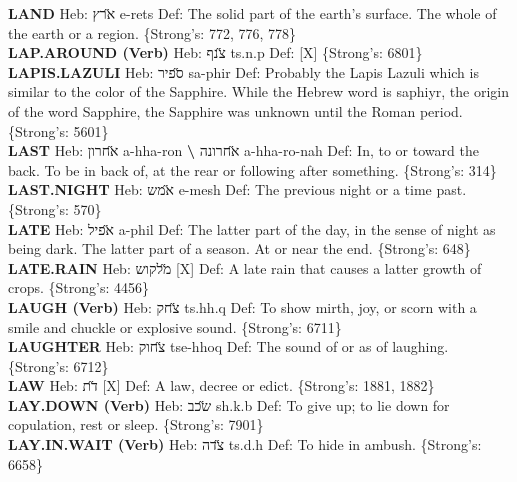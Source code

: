 {\textbf{LAND} Heb: {\large\H ארץ} e-rets Def: The solid part of the earth's surface. The whole of the earth or a region. \{Strong's: 772, 776, 778\}\hfill{}\\

\textbf{LAP.AROUND (Verb)} Heb: {\large\H צנף} ts.n.p Def: {[}X{]} \{Strong's: 6801\}\hfill{}\\

\textbf{LAPIS.LAZULI} Heb: {\large\H ספיר} sa-phir Def: Probably the Lapis Lazuli which is similar to the color of the Sapphire. While the Hebrew word is saphiyr, the origin of the word Sapphire, the Sapphire was unknown until the Roman period. \{Strong's: 5601\}\hfill{}\\

\textbf{LAST} Heb: {\large\H אחרון} a-hha-ron \textbf{\textbackslash{}} {\large\H אחרונה} a-hha-ro-nah Def: In, to or toward the back. To be in back of, at the rear or following after something. \{Strong's: 314\}\hfill{}\\

\textbf{LAST.NIGHT} Heb: {\large\H אמש} e-mesh Def: The previous night or a time past. \{Strong's: 570\}\hfill{}\\

\textbf{LATE} Heb: {\large\H אפיל} a-phil Def: The latter part of the day, in the sense of night as being dark. The latter part of a season. At or near the end. \{Strong's: 648\}\hfill{}\\

\textbf{LATE.RAIN} Heb: {\large\H מלקוש} {[}X{]} Def: A late rain that causes a latter growth of crops. \{Strong's: 4456\}\hfill{}\\

\textbf{LAUGH (Verb)} Heb: {\large\H צחק} ts.hh.q Def: To show mirth, joy, or scorn with a smile and chuckle or explosive sound. \{Strong's: 6711\}\hfill{}\\

\textbf{LAUGHTER} Heb: {\large\H צחוק} tse-hhoq Def: The sound of or as of laughing. \{Strong's: 6712\}\hfill{}\\

\textbf{LAW} Heb: {\large\H דת} {[}X{]} Def: A law, decree or edict. \{Strong's: 1881, 1882\}\hfill{}\\

\textbf{LAY.DOWN (Verb)} Heb: {\large\H שכב} sh.k.b Def: To give up; to lie down for copulation, rest or sleep. \{Strong's: 7901\}\hfill{}\\

\textbf{LAY.IN.WAIT (Verb)} Heb: {\large\H צדה} ts.d.h Def: To hide in ambush. \{Strong's: 6658\}\hfill{}\\

}
